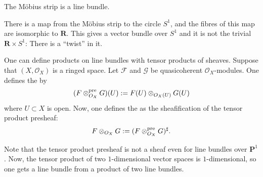 \documentclass [11 pt, oneside] {article}
\begin{document}
\begin{example}
	The M\"obius strip is a line bundle.
	\iffalse
\begin{center}
\begin{tikzpicture}
\begin{axis}[
    hide axis,
    view={40}{65}
]
\addplot3 [
    surf, shader = faceted interp,
    point meta = x,
    colormap/greenyellow,
    samples = 40,
    samples y = 5,
    z buffer = sort,
    domain = 0:360,
    y domain = -0.5:0.5,
    grid = none
] (
    {(1+0.5*y*cos(x/2)))*cos(x)},
    {(1+0.5*y*cos(x/2)))*sin(x)},
    {0.5*y*sin(x/2)});

\end{axis}
\end{tikzpicture}
\end{center}
	\fi
	There is a map from the M\"obius strip to the circle $S^1$, and the fibres of this map are isomorphic to $\mathbf{R}$. This gives a vector bundle over $S^1$ and it is not the trivial $\mathbf{R}\times S^1$: There is a ``twist'' in it.
\end{example}

One can define products on line bundles with tensor products of sheaves. Suppose that $(X,\mathscr{O}_X)$ is a ringed space. Let $\mathscr{F}$ and $\mathscr{G}$ be quasicoherent $\mathscr{O}_X$-modules. One defines the  by
\begin{align*}
	(\relax{F}\otimes^{\textrm{pre}}_{\relax{O}_X} \relax{G})(U) :=  \relax{F}(U) \otimes_{\relax{O}_X(U)}  \relax{G}(U)
\end{align*}
where $U\subset X$ is open. Now, one defines the  as the sheafification of the tensor product presheaf:
\begin{align*}
	\relax{F}\otimes_{\relax{O}_X} \relax{G} := (\relax{F}\otimes^{\textrm{pre}}_{\relax{O}_X}\relax{G})^\sharp.
\end{align*}

Note that the tensor product presheaf is not a sheaf even for line bundles over $\mathbf{P}^1$. Now, the tensor product of two $1$-dimensional vector spaces is $1$-dimensional, so one gets a line bundle from a product of two line bundles.
\end{document}
